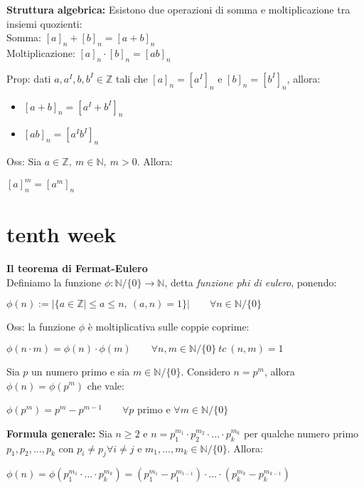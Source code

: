 \documentclass[12pt, a4paper]{article}
\begin{document}
\textbf{Struttura algebrica:} Esistono due operazioni di somma e moltiplicazione tra insiemi quozienti:\\
Somma: $[a]_{n}+[b]_{n}=[a+b]_{n}$\\
Moltiplicazione: $[a]_{n}\cdot[b]_{n}=[ab]_{n}$

Prop: dati $a,a^{I},b,b^{I}\in\mathbb{Z}$ tali che $[a]_{n}=[a^{I}]_{n}$ e $[b]_{n}=[b^{I}]_{n}$, allora:
\begin{itemize}
    \item $[a+b]_{n}=[a^{I}+b^{I}]_{n}$
    \item $[ab]_{n}=[a^{I}b^{I}]_{n}$
\end{itemize}

Oss: Sia $a\in\mathbb{Z},\ m\in\mathbb{N},\ m>0$. Allora:
\begin{center}
    $[a]_{n}^{m}=[a^{m}]_{n}$
\end{center}

\newpage
\section{tenth week}
\textbf{Il teorema di Fermat-Eulero}\\Definiamo la funzione $\phi:\mathbb{N}/\{0\}\rightarrow\mathbb{N}$, detta
\textit{funzione phi di eulero}, ponendo:
\begin{center}
    $\phi(n):=|\{a\in\mathbb{Z}\mid \leq a\leq n,\ (a,n)=1\}|\qquad\forall n\in\mathbb{N}/\{0\}$
\end{center}

Oss: la funzione $\phi$ è moltiplicativa sulle coppie coprime:
\begin{center}
    $\phi(n\cdot m)=\phi(n)\cdot\phi(m)\qquad \forall n,m\in\mathbb{N}/\{0\}\ tc\ (n,m)=1$
\end{center}

Sia $p$ un numero primo e sia $m\in\mathbb{N}/\{0\}$. Considero $n=p^{m}$, allora $\phi(n)=\phi(p^{m})$ che vale:
\begin{center}
    $\phi(p^{m})=p^{m}-p^{m-1}\qquad \forall p$ primo e $\forall m\in\mathbb{N}/\{0\}$
\end{center}

\textbf{Formula generale:} Sia $n\geq 2$ e $n=p_{1}^{m_{1}}\cdot p_{2}^{m_{2}}\cdot...\cdot p_{k}^{m_{k}}$ per 
qualche numero primo $p_{1},p_{2},...,p_{k}$ con $p_{i}\neq p_{j} \forall i\neq j$ e $m_{1},...,m_{k}\in\mathbb{N}
/\{0\}$. Allora:
\begin{center}
    $\phi(n)=\phi(p_{1}^{m_{1}}\cdot ... \cdot p_{k}^{m_{k}})=(p_{1}^{m_{1}}-p_{1}^{m_{1-1}})\cdot ... \cdot
    (p_{k}^{m_{k}}-p_{k}^{m_{k-1}})$
\end{center}
\end{document}
